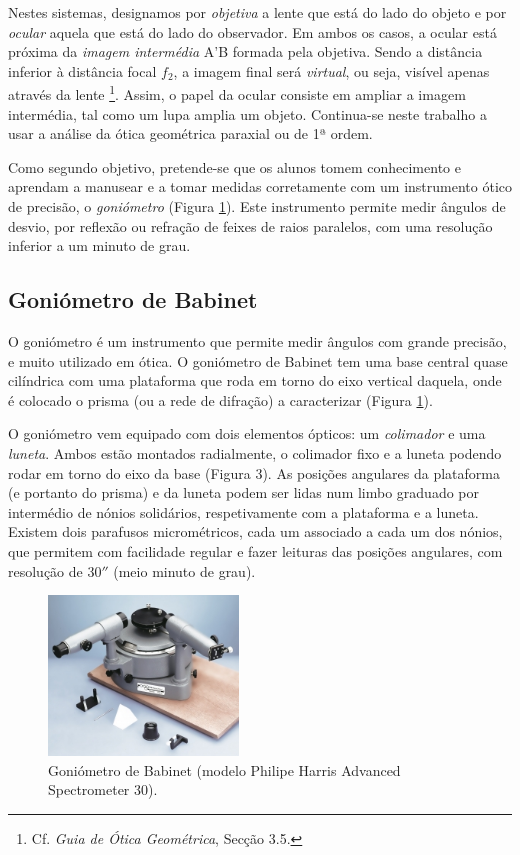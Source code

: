 \documentclass[a4paper,12pt]{article}      %
\begin{document}
Nestes sistemas, designamos por \emph{objetiva} a lente que está do lado do objeto e por \emph{ocular} aquela que está do lado do observador. Em ambos os casos, a ocular está  próxima da \emph{imagem intermédia} A'B formada pela objetiva. Sendo a distância inferior à distância focal $f_2$, a imagem final será \emph{virtual}, ou seja, visível apenas através da lente \footnote{Cf. \emph{Guia de Ótica Geométrica}, Secção 3.5.}.
Assim, o papel da ocular consiste em ampliar a imagem intermédia, tal como um lupa amplia um objeto.
 Continua-se neste trabalho a usar a análise da ótica geométrica paraxial ou de 1ª ordem.


Como segundo objetivo, pretende-se que os alunos tomem conhecimento e aprendam a manusear e a tomar medidas corretamente  com um instrumento ótico de precisão, o \emph{goniómetro} (Figura \ref{fig:goniometer}). Este instrumento permite medir ângulos de desvio, por reflexão ou refração de feixes de raios paralelos, com uma resolução inferior a um minuto de grau.

\subsection{\sf Goniómetro de Babinet}
O goniómetro é um instrumento que permite medir ângulos com grande precisão, e muito utilizado em ótica. O goniómetro de Babinet tem uma base central quase cilíndrica com uma plataforma que roda em torno do eixo vertical daquela, onde é colocado o prisma (ou a rede de difração) a caracterizar (Figura \ref{fig:goniometer}). 

O goniómetro vem equipado com dois elementos ópticos: um \emph{colimador} e uma \emph{luneta}. Ambos estão montados radialmente, o colimador fixo e a luneta podendo rodar em torno do eixo da base (Figura 3). As posições angulares da plataforma (e portanto do prisma) e da luneta podem ser lidas num limbo graduado por intermédio de nónios solidários, respetivamente com a plataforma e a luneta. Existem dois parafusos micrométricos, cada um associado a cada um dos nónios, que permitem com facilidade regular e fazer leituras das posições angulares, com resolução de $30''$ (meio minuto de grau).

\begin{figure}[htb]  
\centering 
	\includegraphics[width=0.45\textwidth]{goniometer}
	\caption{Goniómetro de Babinet (modelo Philipe Harris Advanced Spectrometer 30). \label{fig:goniometer}} 
\end{figure}
\end{document}
